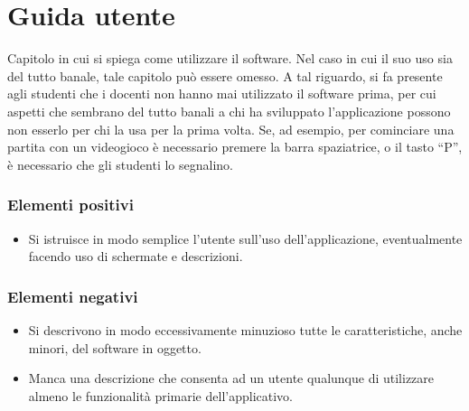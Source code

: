 \documentclass[a4paper,12pt]{report}
\begin{document}
\chapter{Guida utente}

Capitolo in cui si spiega come utilizzare il software. Nel caso in cui il suo uso sia del tutto 
banale, tale capitolo può essere omesso.
%
A tal riguardo, si fa presente agli studenti che i docenti non hanno mai utilizzato il software 
prima, per cui aspetti che sembrano del tutto banali a chi ha sviluppato l'applicazione possono non 
esserlo per chi la usa per la prima volta.
%
Se, ad esempio, per cominciare una partita con un videogioco è necessario premere la barra 
spaziatrice, o il tasto ``P'', è necessario che gli studenti lo segnalino.

\subsection*{Elementi positivi}

\begin{itemize}
 \item Si istruisce in modo semplice l'utente sull'uso dell'applicazione, eventualmente facendo uso di schermate e descrizioni.
\end{itemize}

\subsection*{Elementi negativi}
\begin{itemize}
 \item Si descrivono in modo eccessivamente minuzioso tutte le caratteristiche, anche minori, del software in oggetto.
 \item Manca una descrizione che consenta ad un utente qualunque di utilizzare almeno le funzionalità primarie dell'applicativo.
\end{itemize}



\end{document}

